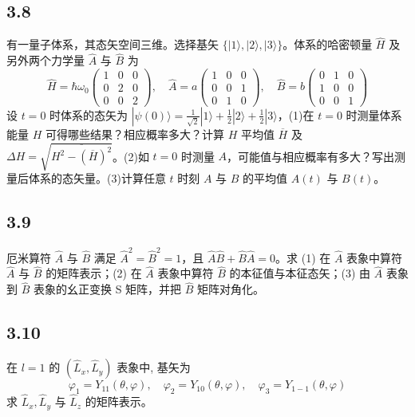 \subsection{3.8}
有一量子体系，其态矢空间三维。选择基矢 $\{|1\rangle, |2\rangle, |3\rangle\}$。体系的哈密顿量 $\hat{H}$ 及另外两个力学量 $\hat{A}$ 与 $\hat{B}$ 为
$$\hat{H} = \hbar \omega_0 
\begin{pmatrix}
1 & 0 & 0 \\
0 & 2 & 0 \\
0 & 0 & 2
\end{pmatrix}, \quad \hat{A} = a 
\begin{pmatrix}
1 & 0 & 0 \\
0 & 0 & 1 \\
0 & 1 & 0
\end{pmatrix}, \quad \hat{B} = b 
\begin{pmatrix}
0 & 1 & 0 \\
1 & 0 & 0 \\
0 & 0 & 1
\end{pmatrix}$$
设 $t = 0$ 时体系的态矢为 $|\psi(0)\rangle = \frac{1}{\sqrt{2}} |1\rangle + \frac{1}{2} |2\rangle + \frac{1}{2} |3\rangle$，(1)在 $t = 0$ 时测量体系能量 $H$ 可得哪些结果？相应概率多大？计算 $H$ 平均值 $\overline{H}$ 及 $\Delta H = \sqrt{\overline{H^2 - (\overline{H})^2}}$。(2)如 $t = 0$ 时测量 $A$，可能值与相应概率有多大？写出测量后体系的态矢量。(3)计算任意 $t$ 时刻 $A$ 与 $B$ 的平均值 $A(t)$ 与 $B(t)$。

\subsection{3.9}
厄米算符 $\hat{A}$ 与 $\hat{B}$ 满足 $\hat{A}^2 = \hat{B}^2 = 1$，且 $\hat{A} \hat{B} + \hat{B} \hat{A} = 0$。求 (1) 在 $\hat{A}$ 表象中算符 $\hat{A}$ 与 $\hat{B}$ 的矩阵表示；(2) 在 $\hat{A}$ 表象中算符 $\hat{B}$ 的本征值与本征态矢；(3) 由 $\hat{A}$ 表象到 $\hat{B}$ 表象的幺正变换 S 矩阵，并把 $\hat{B}$ 矩阵对角化。

\subsection{3.10}
在 $l = 1$ 的 $(\hat{L}_x, \hat{L}_y)$ 表象中, 基矢为
$$\varphi_1 = Y_{11}(\theta, \varphi), \quad \varphi_2 = Y_{10}(\theta, \varphi), \quad \varphi_3 = Y_{1-1}(\theta, \varphi)$$
求 $\hat{L}_x, \hat{L}_y$ 与 $\hat{L}_z$ 的矩阵表示。

